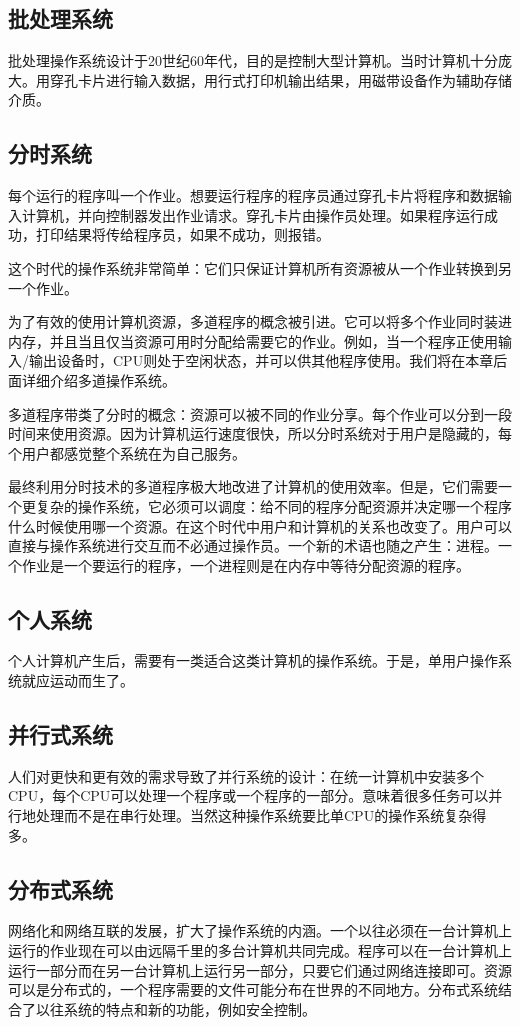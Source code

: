 \subsection{批处理系统}
批处理操作系统设计于20世纪60年代，目的是控制大型计算机。当时计算机十分庞大。用穿孔卡片进行输入数据，用行式打印机输出结果，用磁带设备作为辅助存储介质。
\subsection{分时系统}
每个运行的程序叫一个作业。想要运行程序的程序员通过穿孔卡片将程序和数据输入计算机，并向控制器发出作业请求。穿孔卡片由操作员处理。如果程序运行成功，打印结果将传给程序员，如果不成功，则报错。

这个时代的操作系统非常简单：它们只保证计算机所有资源被从一个作业转换到另一个作业。

为了有效的使用计算机资源，多道程序的概念被引进。它可以将多个作业同时装进内存，并且当且仅当资源可用时分配给需要它的作业。例如，当一个程序正使用输入/输出设备时，CPU则处于空闲状态，并可以供其他程序使用。我们将在本章后面详细介绍多道操作系统。

多道程序带类了分时的概念：资源可以被不同的作业分享。每个作业可以分到一段时间来使用资源。因为计算机运行速度很快，所以分时系统对于用户是隐藏的，每个用户都感觉整个系统在为自己服务。

最终利用分时技术的多道程序极大地改进了计算机的使用效率。但是，它们需要一个更复杂的操作系统，它必须可以调度：给不同的程序分配资源并决定哪一个程序什么时候使用哪一个资源。在这个时代中用户和计算机的关系也改变了。用户可以直接与操作系统进行交互而不必通过操作员。一个新的术语也随之产生：进程。一个作业是一个要运行的程序，一个进程则是在内存中等待分配资源的程序。
\subsection{个人系统}
个人计算机产生后，需要有一类适合这类计算机的操作系统。于是，单用户操作系统就应运动而生了。
\subsection{并行式系统}
人们对更快和更有效的需求导致了并行系统的设计：在统一计算机中安装多个CPU，每个CPU可以处理一个程序或一个程序的一部分。意味着很多任务可以并行地处理而不是在串行处理。当然这种操作系统要比单CPU的操作系统复杂得多。
\subsection{分布式系统}
网络化和网络互联的发展，扩大了操作系统的内涵。一个以往必须在一台计算机上运行的作业现在可以由远隔千里的多台计算机共同完成。程序可以在一台计算机上运行一部分而在另一台计算机上运行另一部分，只要它们通过网络连接即可。资源可以是分布式的，一个程序需要的文件可能分布在世界的不同地方。分布式系统结合了以往系统的特点和新的功能，例如安全控制。
